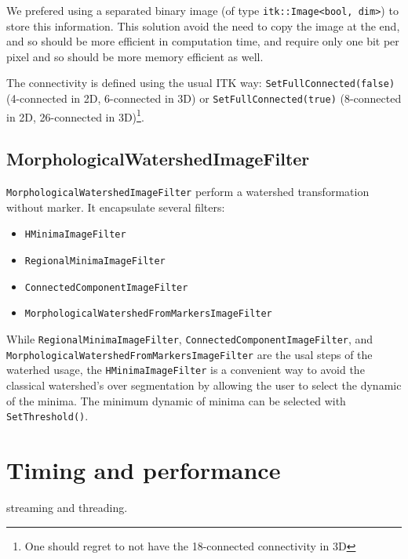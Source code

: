 \documentclass{InsightArticle}
\begin{document}
We prefered using a separated binary image (of type \verb$itk::Image<bool, dim>$)
to store this information. This solution avoid the need to copy the image at
the end, and so should be more efficient in computation time, and require only
one bit per pixel and so should be more memory efficient as well.

The connectivity is defined using the usual ITK way: \verb$SetFullConnected(false)$
(4-connected in 2D, 6-connected in 3D) or \verb$SetFullConnected(true)$ (8-connected
in 2D, 26-connected in 3D)\footnote{One should regret to not have the 18-connected
connectivity in 3D}.

  \subsection{MorphologicalWatershedImageFilter}

\verb$MorphologicalWatershedImageFilter$ perform a watershed transformation
without marker. It encapsulate several filters:
\begin{itemize}
  \item \verb$HMinimaImageFilter$
  \item \verb$RegionalMinimaImageFilter$
  \item \verb$ConnectedComponentImageFilter$
  \item \verb$MorphologicalWatershedFromMarkersImageFilter$
\end{itemize}
While \verb$RegionalMinimaImageFilter$, \verb$ConnectedComponentImageFilter$,
and \verb$MorphologicalWatershedFromMarkersImageFilter$ are the usal steps
of the waterhed usage, the \verb$HMinimaImageFilter$ is a convenient way
to avoid the classical watershed's over segmentation by allowing the user
to select the dynamic of the minima. The minimum dynamic of minima can be
selected with \verb$SetThreshold()$.


\section{Timing and performance}
streaming and threading.
\end{document}
